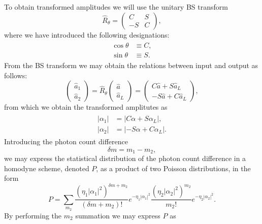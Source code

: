 {To obtain transformed amplitudes we will use the unitary BS transform} 
\begin{equation}
    \hat{R}_\theta=\begin{pmatrix}
C&S\\-S&C
\end{pmatrix},
\end{equation}
{where we have introduced the following designations:}
\begin{align}
\begin{split}
    \cos\theta&\equiv C,\\
    \sin\theta&\equiv S.
\end{split}
\end{align}
{From the BS transform we may obtain the relations between input and output as follows:}
\begin{equation}
    \begin{pmatrix}
\hat{a}_1\\\hat{a}_2
\end{pmatrix}=
\hat{R}_\theta
\begin{pmatrix}
\hat{a}\\\hat{a}_L
\end{pmatrix}=
\begin{pmatrix}
C\hat{a}+S\hat{a}_L\\
-S\hat{a}+C\hat{a}_L
\end{pmatrix}, \label{eq:h-BS}
\end{equation}
{from which we obtain the transformed amplitutes as}
\begin{align}
\begin{split}
|\alpha_1|&=|C\alpha+S\alpha_L|, \\
|\alpha_2|&=|-S\alpha+C\alpha_L|.
\end{split} \label{eq:amplitudes}
\end{align}
Introducing the photon count difference 
\begin{equation}
    \delta m = m_1-m_2,
\end{equation}
we may express the statistical distribution of the photon count difference in a homodyne scheme, denoted $P$, as a product of two Poisson distributions, in the form
\begin{equation}
    P=\sum_{m_2}
\frac{(\eta_1|\alpha_1|^2)^{\delta m+m_2}}{(\delta m+m_2)!}e^{-\eta_1|\alpha_1|^2}
\frac{(\eta_2|\alpha_2|^2)^{m_2}}{m_2!}e^{-\eta_2|\alpha_2|^2}.
\label{eq:poisson}
\end{equation}
By performing the $m_2$ summation we may express $P$ as ~\cite{skellam1946frequency}
